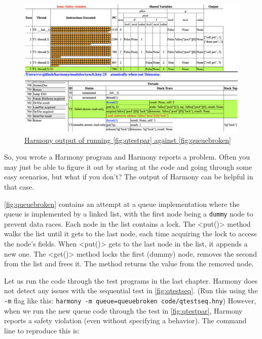 \documentclass{report}
\newcommand{\harmonyref}[2]{%
\href{https://harmony.cs.cornell.edu/output/#1}{\underline{#2}}%
}
\begin{document}
\begin{figure}
\begin{center}
\includegraphics[width=\textwidth]{figures/queuebroken1.png}
\end{center}
\caption{\harmonyref{queuebug.html}{Harmony output of running
\autoref{fig:qtestpar} against \autoref{fig:queuebroken}}}
\label{fig:queuebroken1}
\end{figure}

So, you wrote a Harmony program and Harmony reports a problem.
Often you may just be able to figure it out by staring at the code and
going through some easy scenarios, but what if you don't?
The output of Harmony can be helpful in that case.

\autoref{fig:queuebroken} contains an attempt at a queue implementation
where the queue is implemented by a linked list, with the first node
being a \texttt{dummy} node to prevent data races.  Each node in the
list contains a lock.  The <{put()}> method walks the list until
it gets to the last node, each time acquiring the lock to access the
node's fields.  When <{put()}> gets to the last node in the list,
it appends a new one.  The <{get()}> method locks the first (dummy)
node, removes the second from the list and frees it.  The method returns
the value from the removed node.

Let us run the code through the test programs in the last
chapter.  Harmony does not detect any issues with the sequential test
in \autoref{fig:qtestseq}.
(Run this using the \texttt{-m} flag like this:
\texttt{harmony -m queue=queuebroken code/qtestseq.hny})
However, when we run
the new queue code through the test in \autoref{fig:qtestpar}, Harmony
reports a safety violation (even without specifying a behavior).
The command line to reproduce this is:
\end{document}
